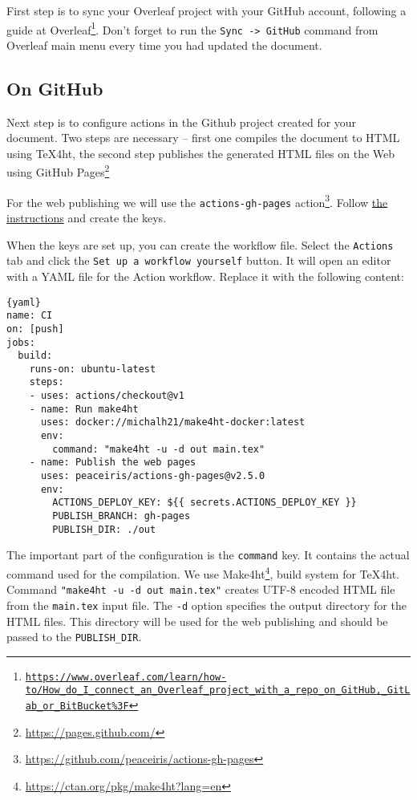 \documentclass{article}
\newcommand{\cmdname}[1]{\texttt{#1}}
\newcommand\footurl[1]{\footnote{\url{#1}}}
\begin{document}
First step is to sync your Overleaf project with your GitHub account, following a guide at 
Overleaf\footnote{\href{https://www.overleaf.com/learn/how-to/How_do_I_connect_an_Overleaf_project_with_a_repo_on_GitHub,_GitLab_or_BitBucket\%3F}
{\texttt{https://www.overleaf.com/learn/how-to/How\_do\_I\_connect\_an\_Overleaf\_project\_with\_a\allowbreak\_repo\_on\_GitHub,\_GitLab\_or\_BitBucket\%3F}}}. 
Don't forget to run the \cmdname{Sync -> GitHub} command from Overleaf main menu every time you had updated the document.

\subsection{On GitHub}
Next step is to configure actions in the Github project created for your document. Two steps are necessary -- first  one compiles the document to HTML using \TeX4ht, the second step publishes the generated HTML files on the Web using GitHub Pages\footurl{https://pages.github.com/}

For the web publishing we will use the \verb|actions-gh-pages| action\footurl{https://github.com/peaceiris/actions-gh-pages}. Follow \href{https://github.com/peaceiris/actions-gh-pages\#1-add-ssh-deploy-key}{the instructions} and create the keys.

When the keys are set up, you can create the workflow file. Select the \cmdname{Actions} tab and click the \cmdname{Set up a workflow yourself} button. It will open an editor with a YAML file for the Action workflow. Replace it with the following content:

\begin{lstlisting}{yaml}
name: CI
on: [push]
jobs:
  build:
    runs-on: ubuntu-latest
    steps:
    - uses: actions/checkout@v1
    - name: Run make4ht
      uses: docker://michalh21/make4ht-docker:latest
      env:
        command: "make4ht -u -d out main.tex"
    - name: Publish the web pages
      uses: peaceiris/actions-gh-pages@v2.5.0
      env:
        ACTIONS_DEPLOY_KEY: ${{ secrets.ACTIONS_DEPLOY_KEY }}
        PUBLISH_BRANCH: gh-pages
        PUBLISH_DIR: ./out    
\end{lstlisting}

The important part of the configuration is the \cmdname{command} key. It contains the actual command used for the compilation. We use Make4ht\footurl{https://ctan.org/pkg/make4ht?lang=en}, build system for \TeX4ht.
Command \verb|"make4ht -u -d out main.tex"| creates UTF-8 encoded HTML file from the \cmdname{main.tex} input file. The \texttt{-d} option specifies the output directory for the HTML files. This directory will be used for the web publishing and should be passed to the \verb|PUBLISH_DIR|.
\end{document}
